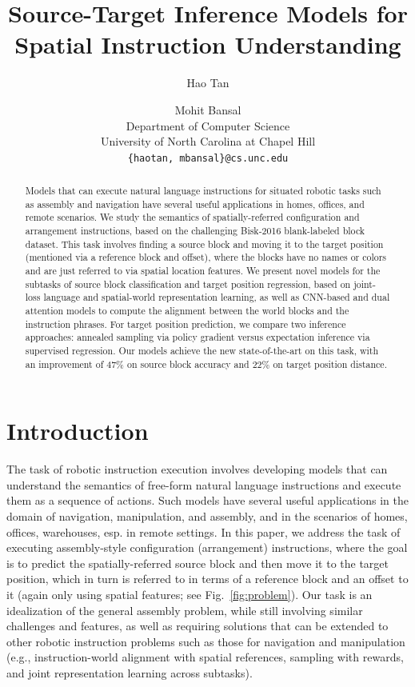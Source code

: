 \documentclass[letterpaper]{article} %
\title{Source-Target Inference Models for Spatial Instruction Understanding}
\author{Hao Tan \and Mohit Bansal\\
Department of Computer Science\\
University of North Carolina at Chapel Hill\\
\texttt{\{haotan, mbansal\}@cs.unc.edu}\\
}
\date{}
\begin{document}
\maketitle

\begin{abstract}
Models that can execute natural language instructions for situated robotic tasks such as assembly and navigation have several useful applications in homes, offices, and remote scenarios.
We study the semantics of spatially-referred configuration and arrangement instructions, based on the challenging Bisk-2016 blank-labeled block dataset. This task involves finding a source block and moving it to the target position (mentioned via a reference block and offset), where the blocks have no names or colors and are just referred to via spatial location features.
We present novel models for the subtasks of source block classification and target position regression, based on joint-loss language and spatial-world representation learning, as well as CNN-based and dual attention models to compute the alignment between the world blocks and the instruction phrases. For target position prediction, we compare two inference approaches: annealed sampling via policy gradient versus expectation inference via supervised regression. Our models achieve the new state-of-the-art on this task, with an improvement of 47\% on source block accuracy and 22\% on target position distance.

\end{abstract}


\section{Introduction}

The task of robotic instruction execution involves developing models that can understand the semantics of free-form natural language instructions and execute them as a sequence of actions. Such models have several useful applications in the domain of navigation, manipulation, and assembly, and in the scenarios of homes, offices, warehouses, esp. in remote settings. In this paper, we address the task of executing assembly-style configuration (arrangement) instructions, where the goal is to predict the spatially-referred source block and then move it to the target position, which in turn is referred to in terms of a reference block and an offset to it (again only using spatial features; see Fig.~\ref{fig:problem}).
Our task is an idealization of the general assembly problem, while still involving similar challenges and features, as well as requiring solutions that can be extended to other robotic instruction problems such as those for navigation and manipulation (e.g., instruction-world alignment with spatial references, sampling with rewards, and joint representation learning across subtasks).
\end{document}
